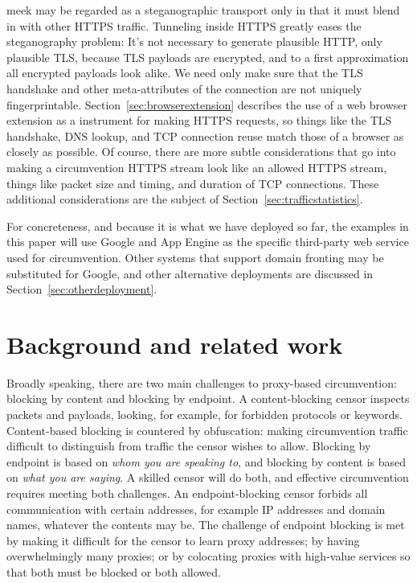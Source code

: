 \documentclass[conference]{IEEEtran}
\begin{document}
meek may be regarded as a steganographic transport only in that it must blend in with other HTTPS traffic.
Tunneling inside HTTPS greatly eases the steganography problem:
It's not necessary to generate plausible HTTP, only plausible TLS,
because TLS payloads are encrypted, and to a first approximation all encrypted payloads look alike.
We need only make sure that the TLS handshake and other meta-attributes of the connection are not uniquely fingerprintable.
Section~\ref{sec:browserextension} describes the use of a web browser extension as a instrument for making HTTPS requests,
so things like the TLS handshake, DNS lookup, and TCP connection reuse match those of a browser as closely as possible.
Of course, there are more subtle considerations that go into
making a circumvention HTTPS stream look like an allowed HTTPS stream,
things like packet size and timing, and duration of TCP connections.
These additional considerations are the subject of Section~\ref{sec:trafficstatistics}.

For concreteness, and because it is what we have deployed so far,
the examples in this paper will use Google and App Engine as the specific
third-party web service used for circumvention.
Other systems that support domain fronting may be substituted for Google,
and other alternative deployments are discussed in Section~\ref{sec:otherdeployment}.

\section{Background and related work}


Broadly speaking, there are two main challenges to proxy-based circumvention:
blocking by content and blocking by endpoint.
A content-blocking censor inspects packets and payloads,
looking, for example, for forbidden protocols or keywords.
Content-based blocking is countered by obfuscation:
making circumvention traffic difficult to distinguish
from traffic the censor wishes to allow.
Blocking by endpoint is based on \emph{whom you are speaking to},
and blocking by content is based on \emph{what you are saying}.
A skilled censor will do both, and effective circumvention requires meeting both challenges.
An endpoint-blocking censor forbids all communication with certain
addresses, for example IP addresses and domain names, whatever the contents may be.
The challenge of endpoint blocking is met by making it difficult for the censor to learn proxy addresses;
by having overwhelmingly many proxies;
or by colocating proxies with high-value services so that both must be blocked or both allowed.
\end{document}

